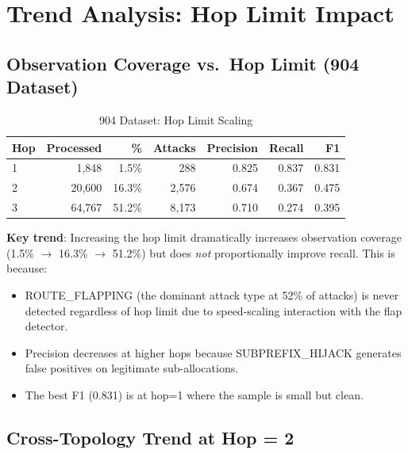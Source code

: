 \documentclass[11pt,a4paper]{article}
\begin{document}
\section{Trend Analysis: Hop Limit Impact}

\subsection{Observation Coverage vs.\ Hop Limit (904 Dataset)}

\begin{table}[H]
\centering
\caption{904 Dataset: Hop Limit Scaling}
\begin{tabular}{lrrrrrr}
\toprule
\textbf{Hop} & \textbf{Processed} & \textbf{\%} & \textbf{Attacks} & \textbf{Precision} & \textbf{Recall} & \textbf{F1} \\
\midrule
1 & 1,848   & 1.5\%  & 288   & 0.825 & 0.837 & 0.831 \\
2 & 20,600  & 16.3\% & 2,576 & 0.674 & 0.367 & 0.475 \\
3 & 64,767  & 51.2\% & 8,173 & 0.710 & 0.274 & 0.395 \\
\bottomrule
\end{tabular}
\end{table}

\textbf{Key trend}: Increasing the hop limit dramatically increases observation
coverage (1.5\% $\to$ 16.3\% $\to$ 51.2\%) but does \emph{not} proportionally
improve recall. This is because:
\begin{itemize}
    \item ROUTE\_FLAPPING (the dominant attack type at 52\% of attacks) is never
          detected regardless of hop limit due to speed-scaling interaction with
          the flap detector.
    \item Precision decreases at higher hops because SUBPREFIX\_HIJACK generates
          false positives on legitimate sub-allocations.
    \item The best F1 (0.831) is at hop=1 where the sample is small but clean.
\end{itemize}

\subsection{Cross-Topology Trend at Hop = 2}
\end{document}
